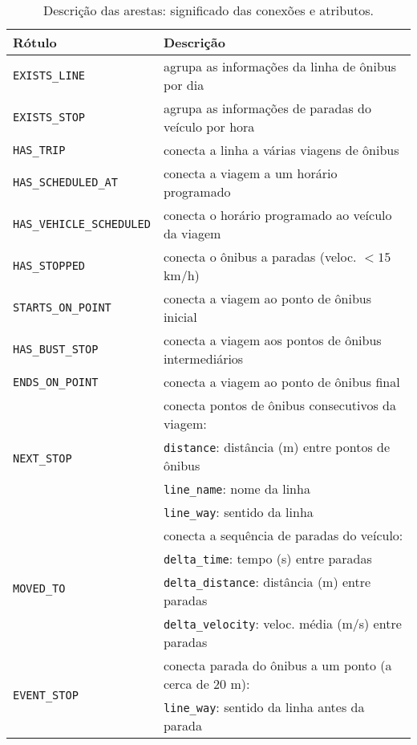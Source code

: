 \begin{table}[!htb]
    \caption{Descrição das arestas: significado das conexões e atributos.}
    \label{tab:arestas}
    \centering
    \small
    \begin{tabular}{ p{5cm}p{8.5cm}} 
    \hline
    Rótulo & Descrição\\
    \hline
    \texttt{EXISTS\_LINE}         & agrupa as informações da linha de ônibus por dia\\
    \texttt{EXISTS\_STOP}         & agrupa as informações de paradas do veículo por hora\\
    \texttt{HAS\_TRIP}       & conecta a linha a várias viagens de ônibus\\
    \texttt{HAS\_SCHEDULED\_AT}        & conecta a viagem a um horário programado\\
    \texttt{HAS\_VEHICLE\_SCHEDULED}             & conecta o horário programado ao veículo da viagem\\
    \texttt{HAS\_STOPPED}          & conecta o ônibus a paradas (veloc. $< 15$ km/h)\\
    \texttt{STARTS\_ON\_POINT}          & conecta a viagem ao ponto de ônibus inicial \\
    \texttt{HAS\_BUST\_STOP}          & conecta a viagem aos pontos de ônibus intermediários\\
    \texttt{ENDS\_ON\_POINT}          & conecta a viagem ao ponto de ônibus final \\
    \hline
    \multirow{4}{*}{\texttt{NEXT\_STOP}} & conecta pontos de ônibus consecutivos da viagem: \\
    & \texttt{distance}: distância (m) entre pontos de ônibus\\
    & \texttt{line\_name}: nome da linha\\
    & \texttt{line\_way}: sentido da linha\\
    \hline
    \multirow{4}{*}{\texttt{MOVED\_TO}}           & conecta a sequência de paradas do veículo: \\
    & \texttt{delta\_time}: tempo (s) entre paradas\\
    & \texttt{delta\_distance}: distância (m) entre paradas\\
    & \texttt{delta\_velocity}: veloc. média (m/s) entre paradas\\
    \hline
    \multirow{2}{*}{\texttt{EVENT\_STOP}}        & conecta parada do ônibus a um ponto (a cerca de 20 m): \\
    &\texttt{line\_way}: sentido da linha antes da parada\\
    \hline
    \end{tabular}
\end{table}

